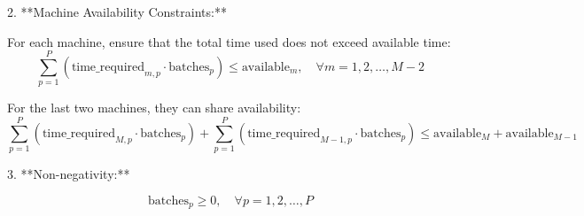 \documentclass{article}
\begin{document}
2. **Machine Availability Constraints:**

   For each machine, ensure that the total time used does not exceed available time:
   \[
   \sum_{p=1}^{P} (\text{time\_required}_{m,p} \cdot \text{batches}_{p}) \leq \text{available}_{m}, \quad \forall m = 1, 2, \ldots, M-2
   \]

   For the last two machines, they can share availability:
   \[
   \sum_{p=1}^{P} (\text{time\_required}_{M,p} \cdot \text{batches}_{p}) + \sum_{p=1}^{P} (\text{time\_required}_{M-1,p} \cdot \text{batches}_{p}) \leq \text{available}_{M} + \text{available}_{M-1}
   \]

3. **Non-negativity:**

   \[
   \text{batches}_{p} \geq 0, \quad \forall p = 1, 2, \ldots, P
   \]
\end{document}
